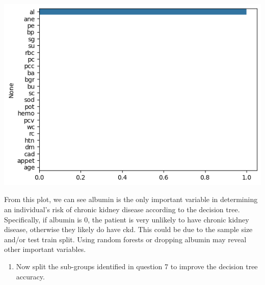 \documentclass[
  11pt,
  letterpaper,
  DIV=11,
  numbers=noendperiod]{scrartcl}
\providecommand{\tightlist}{%
  \setlength{\itemsep}{0pt}\setlength{\parskip}{0pt}}\usepackage{longtable,booktabs,array}
\begin{document}
\includegraphics{Seebach_Lily_HW6_files/figure-pdf/cell-24-output-1.png}

From this plot, we can see albumin is the only important variable in
determining an individual's risk of chronic kidney disease according to
the decision tree. Specifically, if albumin is 0, the patient is very
unlikely to have chronic kidney disease, otherwise they likely do have
ckd. This could be due to the sample size and/or test train split. Using
random forests or dropping albumin may reveal other important variables.

\begin{enumerate}
\def\labelenumi{\arabic{enumi}.}
\setcounter{enumi}{13}
\tightlist
\item
  Now split the sub-groups identified in question 7 to improve the
  decision tree accuracy.
\end{enumerate}
\end{document}

